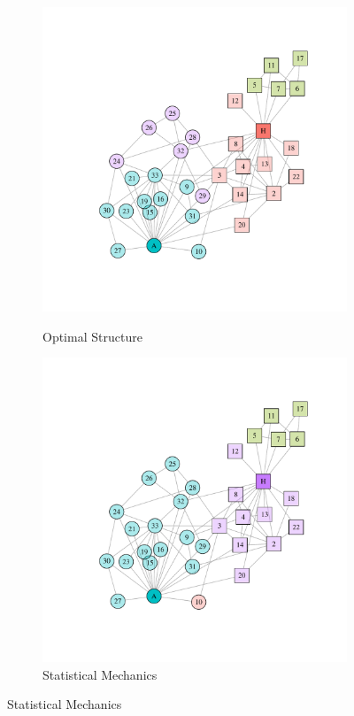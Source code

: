 \begin{figure}
\begin{subfigure}[b]{0.32\textwidth}
\caption{Optimal Structure}
\includegraphics[width=\textwidth,trim={0.75in 0.75in 0.75in 0.75in}, clip=True]{optimal.pdf}
\label{fig:optimal}
\end{subfigure}
\hfill
\begin{subfigure}[b]{0.32\textwidth}
\caption{Statistical Mechanics}
\includegraphics[width=\textwidth,trim={0.75in 0.75in 0.75in 0.75in}, clip=True]{spinglass.pdf}

\end{subfigure}
\end{figure}
